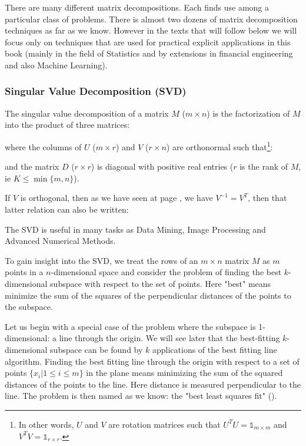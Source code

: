 	There are many different matrix decompositions. Each finds use among a particular class of problems. There is almost two dozens of matrix decomposition techniques as far as we know. However in the texts that will follow below we will focus only on techniques that are used for practical explicit applications in this book (mainly in the field of Statistics and by extensions in financial engineering and also Machine Learning).
	
	\subsubsection{Singular Value Decomposition (SVD)}\label{singula value decomposition}
	The singular value decomposition of a matrix $M$ ($m\times n$) is the factorization of $M$ into the product of three matrices:
	
	where the columns of $U$ ($m\times r$) and $V$ ($r\times n$) are orthonormal such that\footnote{In other words, $U$ and $V$ are rotation matrices such that $U^TU=\mathds{1}_{m\times m}$ and $V^TV=\mathds{1}_{r\times r}$.}:
	
	and the matrix $D$ ($r\times r$) is diagonal with positive real entries ($r$ is the rank of $M$, ie $K\leq \min \{m,n\}$).  
	\begin{tcolorbox}[title=Remark,colframe=black,arc=10pt]
	If $V$ is orthogonal, then as we have seen at page \pageref{orthogonal matrix}, we have $V^{-1}=V^T$, then that latter relation can also be written:
	
	\end{tcolorbox}
	The SVD is useful in many tasks as Data Mining, Image Processing and Advanced Numerical Methods.

	To gain insight into the SVD, we treat the rows of an $m\times n$ matrix $M$ as $m$ points in a $n$-dimensional space and consider the problem of finding the best $k$-dimensional subspace with respect to the set of points. Here "best" means minimize the sum of the squares of the perpendicular distances of the points to the subspace. 

	Let us begin with a special case of the problem where the subspace is 1-dimensional: a line through the origin. We will see later that the best-fitting $k$-dimensional subspace can be found by $k$ applications of the best fitting line algorithm. Finding the best fitting line through the origin with respect to a set of points $\{x_i|1 \leq i \leq m\}$ in the plane means minimizing the sum of the squared distances of the points to the line. Here distance is measured perpendicular to the line. The problem is then named as we know: the "best least squares fit" ().
	
